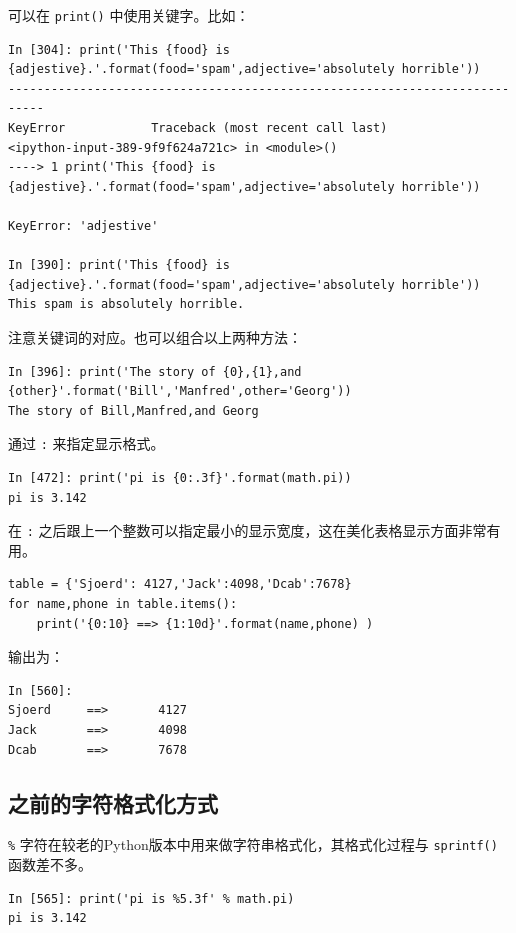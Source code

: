\documentclass[10pt,a4paper,UTF8]{article}
\begin{document}
可以在 \texttt{print()} 中使用关键字。比如：
\lstset{language=Python,label= ,caption= ,captionpos=b,numbers=none}
\begin{lstlisting}
In [304]: print('This {food} is {adjestive}.'.format(food='spam',adjective='absolutely horrible'))
---------------------------------------------------------------------------
KeyError            Traceback (most recent call last)
<ipython-input-389-9f9f624a721c> in <module>()
----> 1 print('This {food} is {adjestive}.'.format(food='spam',adjective='absolutely horrible'))

KeyError: 'adjestive'

In [390]: print('This {food} is {adjective}.'.format(food='spam',adjective='absolutely horrible'))
This spam is absolutely horrible.
\end{lstlisting}

注意关键词的对应。也可以组合以上两种方法：
\lstset{language=Python,label= ,caption= ,captionpos=b,numbers=none}
\begin{lstlisting}
In [396]: print('The story of {0},{1},and {other}'.format('Bill','Manfred',other='Georg'))
The story of Bill,Manfred,and Georg
\end{lstlisting}

通过 \texttt{:} 来指定显示格式。
\lstset{language=Python,label= ,caption= ,captionpos=b,numbers=none}
\begin{lstlisting}
In [472]: print('pi is {0:.3f}'.format(math.pi))
pi is 3.142
\end{lstlisting}
在 \texttt{:} 之后跟上一个整数可以指定最小的显示宽度，这在美化表格显示方面非常有用。
\begin{verbatim}
table = {'Sjoerd': 4127,'Jack':4098,'Dcab':7678}
for name,phone in table.items():
    print('{0:10} ==> {1:10d}'.format(name,phone) )
\end{verbatim}
输出为：
\begin{verbatim}
In [560]: 
Sjoerd     ==>       4127
Jack       ==>       4098
Dcab       ==>       7678
\end{verbatim}
\subsection{之前的字符格式化方式}
\label{sec:org202d00b}


\texttt{\%} 字符在较老的Python版本中用来做字符串格式化，其格式化过程与 \texttt{sprintf()} 函数差不多。

\begin{verbatim}
In [565]: print('pi is %5.3f' % math.pi)
pi is 3.142
\end{verbatim}
\end{document}
